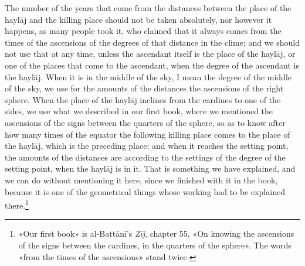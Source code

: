 \documentclass[11pt]{article}
\newcommand{\Fol}[1]{\marginpar{\footnotesize\color{gray}f.\,#1}}
\begin{document}
\par \Fol{48v}The number of the years that come from the distances between the place of the haylāj and the killing place should not be taken absolutely, nor however it happens, as many people took it, who claimed that it always comes from the times of the ascensions of the degrees of that distance in the clime; and we should not use that at any time, unless the ascendant itself is the place of the haylāj, or one of the places that come to the ascendant, when the degree of the ascendant is the haylāj. When it is in the middle of the sky, I mean the degree of the middle of the sky, we use for the amounts of the distances the ascensions of the right sphere. When the place of the haylāj inclines from the cardines to one of the sides, we use what we described in our first book, where we mentioned the ascensions of the signs between the quarters of the sphere, so as to know after how many times of the equator the following killing place comes to the place of the haylāj, which is the preceding place; and when it reaches the setting point, the amounts of the distances are according to the settings of the degree of the setting point, when the haylāj is in it. That is something we have explained, and we can do without mentioning it here, since we finished with it in the book, because it is one of the geometrical things whose working had to be explained there.\footnote{«Our first book» is al-Battānī's \emph{Zīj}, chapter 55, «On knowing the ascensions of the signs between the cardines, in the quarters of the sphere». The words «from the times of the ascensions» stand twice.}\par
\end{document}
